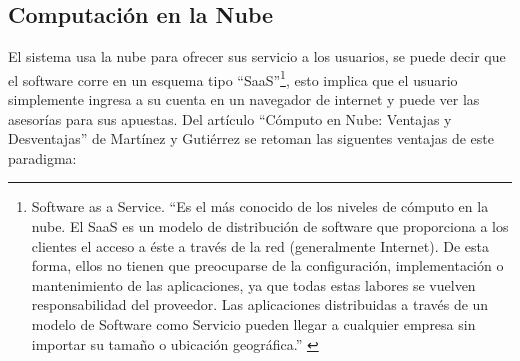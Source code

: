 \subsection{Computación en la Nube}

El sistema usa la nube para ofrecer sus servicio a los usuarios, se puede decir que el software corre en un esquema tipo ``SaaS''\footnote{Software as a Service. ``Es el más conocido de los niveles de cómputo en la nube. El SaaS es un modelo de distribución de software que proporciona a los clientes el acceso a éste a través de la red (generalmente Internet). De esta forma, ellos no tienen que preocuparse de la configuración, implementación o mantenimiento de las aplicaciones, ya que todas estas labores se vuelven responsabilidad del proveedor. Las aplicaciones distribuidas a través de un modelo de Software como Servicio pueden llegar a cualquier empresa sin importar su tamaño o ubicación geográfica.'' \cite{computoNube}}, esto implica que el usuario simplemente ingresa a su cuenta en un navegador de internet y puede ver las asesorías para sus apuestas.  
Del artículo ``Cómputo en Nube: Ventajas y Desventajas'' de Martínez y Gutiérrez \cite{computoNube}  se retoman las siguentes ventajas de este paradigma:

